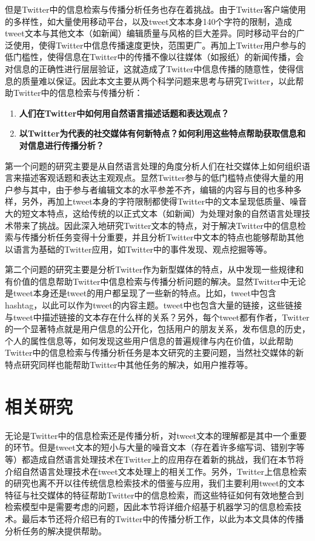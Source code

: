 但是Twitter中的信息检索与传播分析任务也存在着挑战。由于Twitter客户端使用的多样性，如大量使用移动平台，以及tweet文本本身140个字符的限制，造成tweet文本与其他文本（如新闻）编辑质量与风格的巨大差异。同时移动平台的广泛使用，使得Twitter中信息传播速度更快，范围更广。再加上Twitter用户参与的低门槛性，使得信息在Twitter中的传播不像以往媒体（如报纸）的新闻传播，会对信息的正确性进行层层验证，这就造成了Twitter中信息传播的随意性，使得信息的质量难以保证。因此本文主要从两个科学问题来思考与研究Twitter，以此帮助Twitter中的信息检索与传播分析：
    \begin{enumerate}
    \item \textbf{人们在Twitter中如何用自然语言描述话题和表达观点？}
    \item \textbf{以Twitter为代表的社交媒体有何新特点？如何利用这些特点帮助获取信息和对信息进行传播分析？}
    \end{enumerate}  

第一个问题的研究主要是从自然语言处理的角度分析人们在社交媒体上如何组织语言来描述客观话题和表达主观观点。显然Twitter参与的低门槛特点使得大量的用户参与其中，由于参与者编辑文本的水平参差不齐，编辑的内容与目的也多种多样，另外，再加上tweet本身的字符限制都使得Twitter中的文本呈现低质量、噪音大的短文本特点，这给传统的以正式文本（如新闻）为处理对象的自然语言处理技术带来了挑战。因此深入地研究Twitter文本的特点，对于解决Twitter中的信息检索与传播分析任务变得十分重要，并且分析Twitter中文本的特点也能够帮助其他以语言为基础的Twitter应用，如Twitter中的事件发现、观点挖掘等等。

第二个问题的研究主要是分析Twitter作为新型媒体的特点，从中发现一些规律和有价值的信息帮助Twitter中信息检索与传播分析问题的解决。显然Twitter中无论是tweet本身还是tweet的用户都呈现了一些新的特点。比如，tweet中包含hashtag，以此可以作为tweet的内容主题。tweet中也包含大量的链接，这些链接与tweet中描述链接的文本存在什么样的关系？另外，每个tweet都有作者，Twitter的一个显著特点就是用户信息的公开化，包括用户的朋友关系，发布信息的历史，个人的属性信息等，如何发现这些用户信息的普遍规律与内在价值，以此帮助Twitter中的信息检索与传播分析任务是本文研究的主要问题，当然社交媒体的新特点研究同样也能帮助Twitter中其他任务的解决，如用户推荐等。

\section{相关研究}
无论是Twitter中的信息检索还是传播分析，对tweet文本的理解都是其中一个重要的环节。但是tweet文本的短小与大量的噪音文本（存在着许多缩写词、错别字等等）都造成自然语言处理技术在Twitter上的应用存在着新的挑战，我们在本节将介绍自然语言处理技术在tweet文本处理上的相关工作。另外，Twitter上信息检索的研究也离不开以往传统信息检索技术的借鉴与应用，我们主要利用tweet的文本特征与社交媒体的特征帮助Twitter中的信息检索，而这些特征如何有效地整合到检索模型中是需要考虑的问题，因此本节将详细介绍基于机器学习的信息检索技术。最后本节还将介绍已有的Twitter中的传播分析工作，以此为本文具体的传播分析任务的解决提供帮助。

